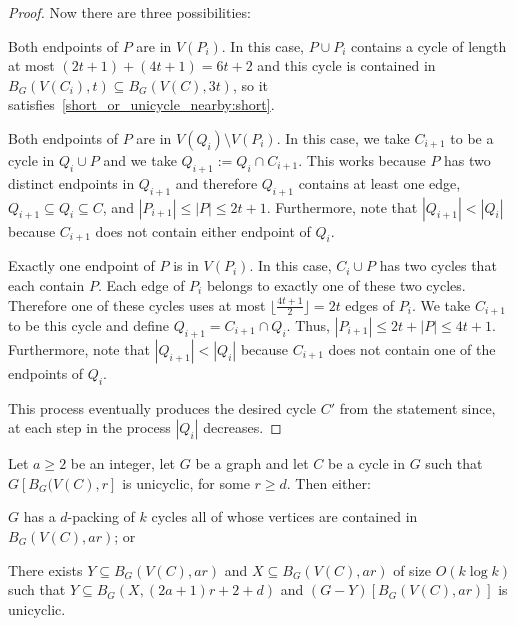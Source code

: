 \documentclass{patmorin}
\begin{document}
\begin{proof}
  Now there are three possibilities:
  \begin{compactenum}
    \item Both endpoints of $P$ are in $V(P_{i})$. 
    In this case, $P\cup P_{i}$ contains a cycle of length at most 
    $(2t+1)+(4t+1)=6t+2$ and this cycle is contained in $B_G(V(C_i),t)\subseteq B_G(V(C),3t)$, so it satisfies~\eqref{short_or_unicycle_nearby:short}. 
    \item Both endpoints of $P$ are in $V(Q_{i})\setminus V(P_{i})$. 
    In this case, we take $C_{i+1}$ to be a cycle in $Q_{i}\cup P$ and
    we take $Q_{i+1}:= Q_i\cap C_{i+1}$. %
    This works because $P$ has two distinct endpoints in $Q_{i+1}$ 
    and therefore $Q_{i+1}$ contains at least one edge, 
    $Q_{i+1}\subseteq Q_i\subseteq C$, and 
    $|P_{i+1}|\leq|P|\leq 2t+1$. 
    Furthermore, note that $|Q_{i+1}| < |Q_{i}|$ because $C_{i+1}$ does not contain either endpoint of $Q_{i}$.
    \item Exactly one endpoint of $P$ is in $V(P_{i})$. 
    In this case, $C_{i}\cup P$ has two cycles that each contain $P$. 
    Each edge of $P_{i}$ belongs to exactly one of these two cycles. 
    Therefore one of these cycles uses at most $\lfloor\frac{4t+1}{2}\rfloor=2t$ edges of $P_{i}$. 
    We take $C_{i+1}$ to be this cycle and define
    $Q_{i+1}=C_{i+1}\cap Q_i$. %
    Thus, $|P_{i+1}| \leq 2t+|P|\leq 4t+1$. 
    Furthermore, note that $|Q_{i+1}| < |Q_{i}|$ because $C_{i+1}$ does not contain one of the endpoints of $Q_{i}$.
  \end{compactenum}
  This process eventually produces the desired cycle $C'$ from the statement since, at each step in the process $|Q_i|$ decreases.
\end{proof}

\begin{lem}\label{grow_unicycle}
  Let $a\ge 2$ be an integer, let $G$ be a graph and let $C$ be a cycle in $G$ such that $G[B_G(V(C),r]$ is unicyclic, for some $r\ge d$.  Then either:
  \begin{compactenum}[(a)]      
    \item $G$ has a $d$-packing of $k$ cycles all of whose vertices are contained in $B_G(V(C), ar)$; or
    \item There exists $Y\subseteq B_G(V(C),ar)$ and $X\subseteq B_G(V(C), ar)$ of size $O(k\log k)$ such that $Y\subseteq B_G(X,(2a+1)r+2+d)$ and $(G-Y)[B_G(V(C),ar)]$ is unicyclic.
  \end{compactenum}
\end{lem}
\end{document}
